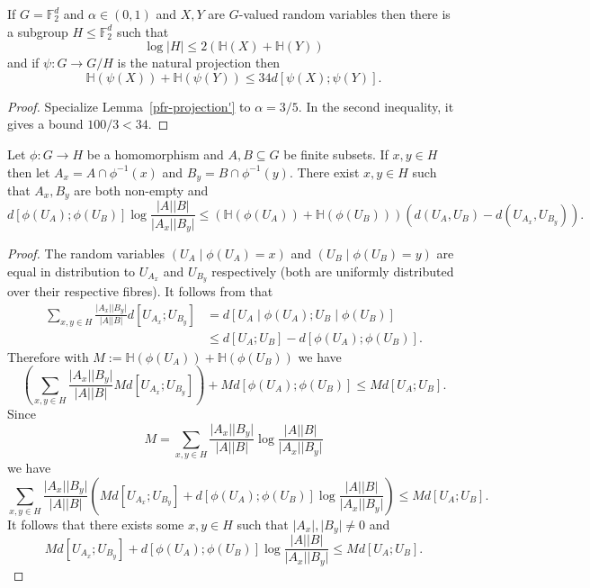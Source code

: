 \begin{lemma}\label{pfr-projection}\leanok
If $G=\mathbb{F}_2^d$ and $\alpha\in (0,1)$ and $X,Y$ are $G$-valued random
variables then there is a subgroup $H\leq \mathbb{F}_2^d$ such that
\[\log \lvert H\rvert \leq 2 (\mathbb{H}(X)+\mathbb{H}(Y))\]
and if $\psi:G \to G/H$ is the natural projection then
\[\mathbb{H}(\psi(X))+\mathbb{H}(\psi(Y))\leq 34 d[\psi(X);\psi(Y)].\]
\end{lemma}
\begin{proof}
\leanok
Specialize Lemma~\ref{pfr-projection'} to $\alpha=3/5$. In the second
inequality, it gives a bound $100/3 < 34$.
\end{proof}



\begin{lemma}\label{single-fibres}\leanok
Let $\phi:G\to H$ be a homomorphism and $A,B\subseteq G$ be finite subsets. If $x,y\in H$ then let $A_x=A\cap \phi^{-1}(x)$ and $B_y=B\cap \phi^{-1}(y)$. There exist $x,y\in H$ such that $A_x,B_y$ are both non-empty and
\[d[\phi(U_A);\phi(U_B)]\log \frac{\lvert A\rvert\lvert B\rvert}{\lvert A_x\rvert\lvert B_y\rvert}\leq (\mathbb{H}(\phi(U_A))+\mathbb{H}(\phi(U_B)))(d(U_A,U_B)-d(U_{A_x},U_{B_y})).\]
\end{lemma}
\begin{proof}
\leanok
The random variables $(U_A\mid \phi(U_A)=x)$ and $(U_B\mid \phi(U_B)=y)$ are equal in distribution to $U_{A_x}$ and $U_{B_y}$ respectively (both are uniformly distributed over their respective fibres). It follows from  that
\begin{align*}
\sum_{x,y\in H}\frac{\lvert A_x\rvert\lvert B_y\rvert}{\lvert A\rvert\lvert B\rvert}d[U_{A_x};U_{B_y}]
&=d[U_A\mid \phi(U_A); U_B\mid \phi(U_B)]\\
&\leq d[U_A;U_B]-d[\phi(U_A);\phi(U_B)].
\end{align*}
Therefore with $M:=\mathbb{H}(\phi(U_A))+\mathbb{H}(\phi(U_B))$ we have
\[\left(\sum_{x,y\in H}\frac{\lvert A_x\rvert\lvert B_y\rvert}{\lvert A\rvert\lvert B\rvert}Md[U_{A_x};U_{B_y}]\right)+Md[\phi(U_A);\phi(U_B)]\leq Md[U_A;U_B].\]
Since
\[M=\sum_{x,y\in H}\frac{\lvert A_x\rvert\lvert B_y\rvert}{\lvert A\rvert\lvert B\rvert}\log \frac{\lvert A\rvert\lvert B\rvert}{\lvert A_x\rvert\lvert B_y\rvert}\]
we have
\[\sum_{x,y\in H} \frac{\lvert A_x\rvert\lvert B_y\rvert}{\lvert A\rvert\lvert B\rvert}\left(Md[U_{A_x};U_{B_y}]+d[\phi(U_A);\phi(U_B)]\log \frac{\lvert A\rvert\lvert B\rvert}{\lvert A_x\rvert\lvert B_y\rvert}\right)\leq  Md[U_A;U_B].\]
It follows that there exists some $x,y\in H$ such that $\lvert A_x\rvert,\lvert B_y\rvert\neq 0$ and
\[Md[U_{A_x};U_{B_y}]+d[\phi(U_A);\phi(U_B)]\log \frac{\lvert A\rvert\lvert B\rvert}{\lvert A_x\rvert\lvert B_y\rvert}\leq  Md[U_A;U_B].\]
\end{proof}


